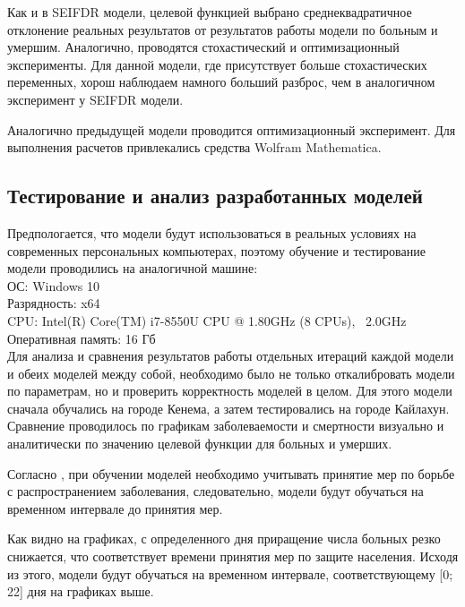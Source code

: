 Как и в SEIFDR модели, целевой функцией выбрано среднеквадратичное отклонение реальных результатов от результатов работы модели по  больным и умершим. Аналогично, проводятся стохастический и оптимизационный эксперименты. 
Для данной модели, где присутствует больше стохастических переменных, хорош наблюдаем намного больший разброс, чем в аналогичном эксперимент у SEIFDR модели.

Аналогично предыдущей модели проводится оптимизационный эксперимент. Для выполнения расчетов привлекались средства Wolfram Mathematica.

\subsection{Тестирование и анализ разработанных моделей}

Предпологается, что модели будут использоваться в реальных условиях на современных персональных компьютерах, поэтому обучение и тестирование модели проводились на аналогичной машине: \\
ОС: Windows 10 \\
Разрядность: x64 \\
CPU: Intel(R) Core(TM) i7-8550U CPU @ 1.80GHz (8 CPUs), ~2.0GHz \\
Оперативная память: 16 Гб \\

Для анализа и сравнения результатов работы отдельных итераций каждой модели и обеих моделей между собой, необходимо было не только откалибровать модели по параметрам, но и проверить корректность моделей в целом. Для этого модели сначала обучались на  городе Кенема, а затем тестировались на городе Кайлахун. Сравнение проводилось по графикам заболеваемости и смертности визуально  и аналитически по значению целевой функции для больных и умерших. 

Согласно %
\cite{Bykova:2015}, при обучении моделей необходимо учитывать принятие мер по борьбе с распространением заболевания, следовательно, модели будут обучаться на временном интервале до принятия мер.

Как видно на графиках, с определенного дня приращение числа больных резко снижается, что соответствует времени принятия мер по защите населения. Исходя из этого, модели будут обучаться на временном интервале, соответствующему  [0; 22] дня на графиках выше.

